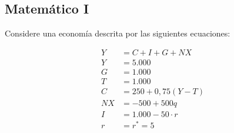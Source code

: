 \documentclass[a4paper]{article}
\begin{document}
\subsection{Matemático I}


Considere una economía descrita por las siguientes ecuaciones:

\begin{align*}
    Y &= C + I + G + NX \\
    Y &= 5.000 \\
    G &= 1.000 \\
    T &= 1.000 \\
    C &= 250 + 0{,}75(Y - T) \\
    NX &= -500 + 500q \\
    I &= 1.000 - 50 \cdot r \\
    r &= r^* = 5
\end{align*}
\end{document}
